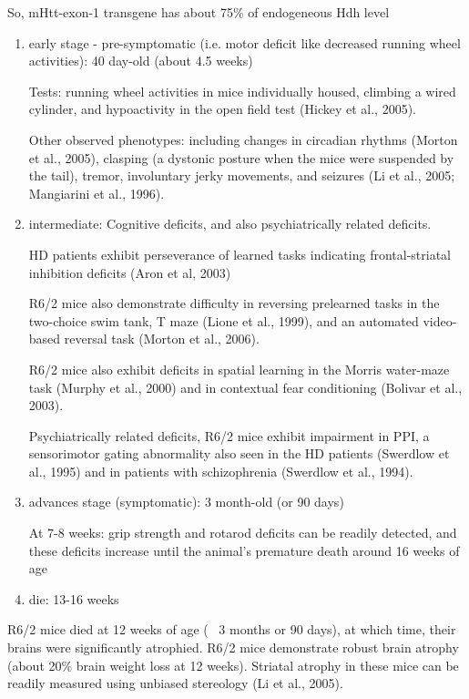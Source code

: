 So, mHtt-exon-1 transgene has about 75\% of endogeneous Hdh level
\begin{enumerate}
  
  \item early stage - pre-symptomatic (i.e. motor deficit like decreased running
  wheel activities): 40 day-old (about 4.5 weeks)
  
Tests:  running wheel activities in mice individually housed, climbing a wired
cylinder, and hypoactivity in the open field test (Hickey et al., 2005).

Other observed phenotypes: including changes in circadian rhythms (Morton et
al., 2005), clasping (a dystonic posture when the mice were suspended by the
tail), tremor, involuntary jerky movements, and seizures (Li et al., 2005;
Mangiarini et al., 1996).
  
  \item intermediate: Cognitive deficits, and also psychiatrically related
  deficits.
  
HD patients exhibit perseverance of learned tasks indicating frontal-striatal
inhibition deficits (Aron et al, 2003)

R6/2 mice also demonstrate difficulty in reversing prelearned tasks in the
two-choice swim tank, T maze (Lione et al., 1999), and an automated video-based
reversal task (Morton et al., 2006).

R6/2 mice also exhibit deficits in spatial learning in the Morris water-maze
task (Murphy et al., 2000) and in contextual fear conditioning (Bolivar et al.,
2003).

Psychiatrically related deficits, R6/2 mice exhibit impairment in PPI, a
sensorimotor gating abnormality also seen in the HD patients (Swerdlow et al.,
1995) and in patients with schizophrenia (Swerdlow et al., 1994).

  \item advances stage (symptomatic): 3 month-old (or 90 days)
  
At 7-8 weeks: grip strength and rotarod deficits can be readily detected, and
these deficits increase until the animal's premature death around 16 weeks of
age
  
  \item die: 13-16 weeks 
\end{enumerate}


R6/2 mice died at 12 weeks of age (~ 3 months or 90 days), at which time, their
brains were significantly atrophied. R6/2 mice demonstrate robust brain atrophy
(about 20\% brain weight loss at 12 weeks). Striatal atrophy in these mice can
be readily measured using unbiased stereology (Li et al., 2005).

